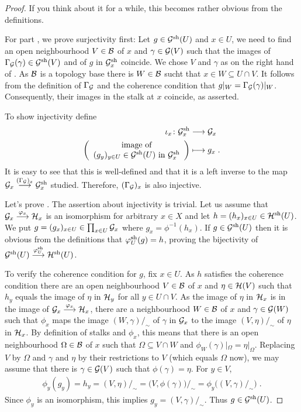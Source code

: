 \documentclass[a4paper,parskip=half,numbers=enddot, DIV=12]{scrreprt}
\begin{document}
\begin{proof}
	 If you think about it for a while, this becomes rather obvious from the definitions.
	
	For part , we prove surjectivity first: Let $g\in\mathcal{G}^{\mathrm{sh}}(U)$ and $x\in U$, we need to find an open neighbourhood $V\in \mathcal{B}$ of $x$ and $\gamma\in \mathcal{G}(V)$ such that the images of $\Gamma_{\mathcal{G}}(\gamma)\in \mathcal{G}^{\mathrm{sh}}(V)$ and of $g$ in $\mathcal{G}^{\mathrm{sh}}_x$ coincide. We chose $V$ and $\gamma$ as on the right hand of . As $\mathcal{B}$ is a topology base there is $W\in\mathcal{B}$ sucht that $x\in W\subseteq U\cap V$. It follows from the definition of $\Gamma_{\mathcal{G}}$ and the coherence condition that $g|_W = \Gamma_{\mathcal{G}}(\gamma)|_W$. Consequently, their images in the stalk at $x$ coincide, as asserted.
	
	To show injectivity define
	\begin{align*}
	    \iota_x\colon \Gg^\sh_x &\morphism \Gg_x\\
	    \bigg(\begin{array}{c}
		    \text{image of}\\
		    (g_y)_{y\in U} \in \Gg^\sh(U) \text{ in } \Gg^\sh_x 
	    \end{array}\bigg) &\longmapsto g_x\;.
	\end{align*}
	It is easy to see that this is well-defined and that it is a left inverse to the map $\Gg_x\morphism[(\Gamma_{\Gg})_x] \Gg^\sh_x$ studied. Therefore, $(\Gamma_{\mathcal{G}})_x$  is also injective.
	
	Let's prove . The assertion about injectivity is trivial. Let us assume that $\Gg_x\morphism[\phi_x]\Hh_x$ is an isomorphism for arbitrary $x\in X$ and let $h=(h_x)_{x\in U}\in \mathcal{H}^{\mathrm{sh}}(U)$. We put $g=(g_x)_{x\in U} \in \prod_{x\in U}\mathcal{G}_x$ where $g_x = \phi^{-1} (h_x)$. If $g\in \mathcal{G}^{\mathrm{sh}}(U)$ then it is obvious from the definitions that $\varphi_U^{\mathrm{sh}}(g) = h$, proving the bijectivity of $\Gg^\sh(U) \morphism[\phi_U^\sh] \Hh^\sh(U)$.
	
	To verify the coherence condition for $g$, fix $x\in U$. As $h$ satisfies the coherence condition there are an open neighbourhood $V\in\mathcal{B}$ of $x$ and $\eta\in\mathcal{H}(V)$ such that $h_y$ equals the image of $\eta$ in $\mathcal{H}_y$ for all $y\in U\cap V$. As the image of $\eta$ in $\mathcal{H}_x$ is in the image of $\Gg_x\morphism[\phi_x]\Hh_x$, there are a neighbourhood $W\in\mathcal{B}$ of $x$ and $\gamma\in\mathcal{G}(W)$ such that $\phi_x$ maps the image $(W,\gamma)/_\sim$ of $\gamma$ in $\mathcal{G}_x$ to the image $(V,\eta)/_\sim$ of $\eta$ in $\mathcal{H}_x$. By definition of stalks and $\phi_x$, this means that there is an open neighbourhood $\Omega\in\mathcal{B}$ of $x$ such that $\Omega\subseteq V\cap W$ and $ \phi_W(\gamma)|_\Omega = \eta|_\Omega$. Replacing $V$ by $\Omega$ and $\gamma$ and $\eta$ by their restrictions to $V$ (which equals $\Omega$ now), we may assume that there is $\gamma\in\mathcal{G}(V)$ such that $\phi(\gamma) = \eta$. For $y\in V$, \begin{align*}
		\phi_y(g_y) = h_y=(V,\eta)/_\sim = \big(V,\phi(\gamma)\big)/_\sim = \phi_y\big((V,\gamma)/_\sim\big)\;.
	\end{align*}
	Since $\phi_y$ is an isomorphism, this implies $g_y = (V,\gamma)/_\sim$. Thus $g\in \mathcal{G}^{\mathrm{sh}}(U)$.
	

\end{proof}
\end{document}
